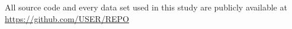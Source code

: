 All source code and every data set used in this study are publicly available at \url{https://github.com/USER/REPO}
